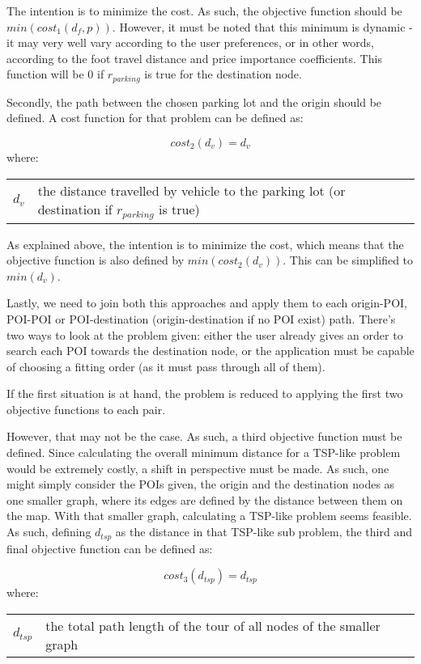 \documentclass[a4paper, 12pt]{report}
\makeatletter
\newenvironment{conditions}
  {\par\vspace{\abovedisplayskip}\noindent\begin{tabular}{>{$}l<{$} @{${}={}$} l}}
  {\end{tabular}\par\vspace{\belowdisplayskip}}
\makeatother
\begin{document}
    The intention is to minimize the cost. As such, the objective function should be $min(cost_1(d_f, p))$. However, it must be noted that this minimum is dynamic - it may very well vary according to the user preferences, or in other words, according to the foot travel distance and price importance coefficients. This function will be 0 if $r_{parking}$ is true for the destination node.
    
    Secondly, the path between the chosen parking lot and the origin should be defined. A cost function for that problem can be defined as:
    
    \begin{equation}
        cost_2(d_v) = d_v
    \end{equation}
    where:
    \begin{conditions}
        d_v     &  the distance travelled by vehicle to the parking lot (or destination if $r_{parking}$ is true)\\
    \end{conditions}
    
    As explained above, the intention is to minimize the cost, which means that the objective function is also defined by $min(cost_2(d_v))$. This can be simplified to $min(d_v)$.
    
    Lastly, we need to join both this approaches and apply them to each origin-POI, POI-POI or POI-destination (origin-destination if no POI exist) path. There's two ways to look at the problem given: either the user already gives an order to search each POI towards the destination node, or the application must be capable of choosing a fitting order (as it must pass through all of them).
    
    If the first situation is at hand, the problem is reduced to applying the first two objective functions to each pair. 
    
    However, that may not be the case. As such, a third objective function must be defined. Since calculating the overall minimum distance for a TSP-like problem would be extremely costly, a shift in perspective must be made. As such, one might simply consider the POIs given, the origin and the destination nodes as one smaller graph, where its edges are defined by the distance between them on the map. With that smaller graph, calculating a TSP-like problem seems feasible. As such, defining $d_{tsp}$ as the distance in that TSP-like sub problem, the third and final objective function can be defined as:
    
    \begin{equation}
        cost_3(d_{tsp}) = d_{tsp}
    \end{equation}
    where:
    \begin{conditions}
        d_{tsp}     &  the total path length of the tour of all nodes of the smaller graph \\
    \end{conditions}
    
\end{document}
